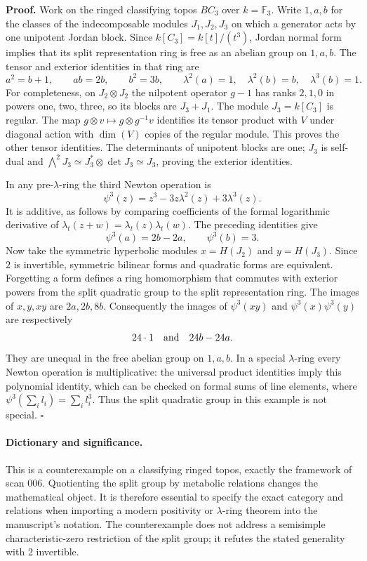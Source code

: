 \documentclass[11pt]{article}
\begin{document}
\textbf{Proof.} Work on the ringed classifying topos $BC_3$ over
$k=\mathbb F_3$.  Write $1,a,b$ for the classes of the indecomposable
modules $J_1,J_2,J_3$ on which a generator acts by one unipotent Jordan
block.  Since $k[C_3]=k[t]/(t^3)$, Jordan normal form implies that its
split representation ring is free as an abelian group on $1,a,b$.
The tensor and exterior identities in that ring are
\[
 a^2=b+1,\qquad ab=2b,\qquad b^2=3b,
 \qquad \lambda^2(a)=1,\quad\lambda^2(b)=b,\quad\lambda^3(b)=1.
\]
For completeness, on $J_2\otimes J_2$ the nilpotent operator $g-1$ has
ranks $2,1,0$ in powers one, two, three, so its blocks are $J_3+J_1$.
The module $J_3=k[C_3]$ is regular.  The map
$g\otimes v\mapsto g\otimes g^{-1}v$ identifies its tensor product with
$V$ under diagonal action with $\dim(V)$ copies of the regular module.
This proves the other tensor identities.  The determinants of unipotent
blocks are one; $J_3$ is self-dual and
$\bigwedge^2J_3\simeq J_3^*\otimes\det J_3\simeq J_3$, proving the
exterior identities.

In any pre-$\lambda$-ring the third Newton operation is
\[
 \psi^3(z)=z^3-3z\lambda^2(z)+3\lambda^3(z).
\]
It is additive, as follows by comparing coefficients of the formal
logarithmic derivative of $\lambda_t(z+w)=\lambda_t(z)\lambda_t(w)$.
The preceding identities give
\[
 \psi^3(a)=2b-2a,\qquad \psi^3(b)=3.
\]
Now take the symmetric hyperbolic modules $x=H(J_2)$ and $y=H(J_3)$.
Since $2$ is invertible, symmetric bilinear forms and quadratic forms
are equivalent.  Forgetting a form defines a ring homomorphism that
commutes with exterior powers from the split quadratic group to the
split representation ring.  The images of $x,y,xy$ are $2a,2b,8b$.
Consequently the images of $\psi^3(xy)$ and $\psi^3(x)\psi^3(y)$ are
respectively
\[
 24\cdot1\quad\hbox{and}\quad24b-24a.
\]
They are unequal in the free abelian group on $1,a,b$.  In a special
$\lambda$-ring every Newton operation is multiplicative: the universal
product identities imply this polynomial identity, which can be checked
on formal sums of line elements, where $\psi^3(\sum_i l_i)=\sum_i l_i^3$.
Thus the split quadratic group in this example is not special.
\hfill$\square$
\paragraph{Dictionary and significance.}
This is a counterexample on a classifying ringed topos, exactly the
framework of scan 006.  Quotienting the split group by metabolic relations
changes the mathematical object.  It is therefore essential to specify
the exact category and relations when importing a modern positivity or
$\lambda$-ring theorem into the manuscript's notation.  The counterexample
does not address a semisimple characteristic-zero restriction of the
split group; it refutes the stated generality with $2$ invertible.
\end{document}
